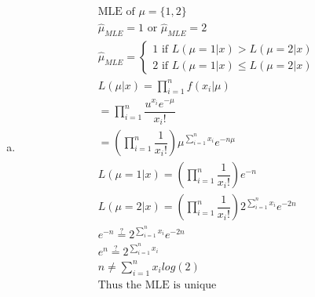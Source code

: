 \documentclass{article}
\newcommand{\prodn}{\prod_{i=1}^{n}}
\newcommand{\sumx}{\sum_{i=1}^{n}x_i}
\newcommand{\ule}{\hat{\mu}_{MLE}}
\begin{document}
\begin{flushleft}
\begin{enumerate}[(a)]
	\item 
\begin{multline*}\\
\text{MLE of } \mu=\{1,2\}\\
\ule = 1 \text{ or } \ule=2\\
\ule=\begin{cases}
1 \text{ if } L(\mu=1|x)>L(\mu=2|x)\\
2 \text{ if } L(\mu=1|x)\leq L(\mu=2|x)
\end{cases}\\
L(\mu|x)=\prodn f(x_i|\mu)\\
=\prodn \dfrac{u^{x_i}e^{-\mu}}{x_i!}\\
=\left(\prodn \dfrac{1}{x_i!}\right) \mu^{\sumx}e^{-n\mu}\\
L(\mu=1|x)=\left(\prodn \dfrac{1}{x_i!}\right)e^{-n}\\
L(\mu=2|x)=\left(\prodn \dfrac{1}{x_i!}\right)2^{\sumx}e^{-2n}\\
e^{-n}\stackrel{?}{=} 2^{\sumx}e^{-2n}\\
e^n\stackrel{?}{=}2^{\sumx}\\
n\neq \sumx log(2)\\
\text{Thus the MLE is unique}\\
\end{multline*}


\end{enumerate}
\end{flushleft}
\end{document}
